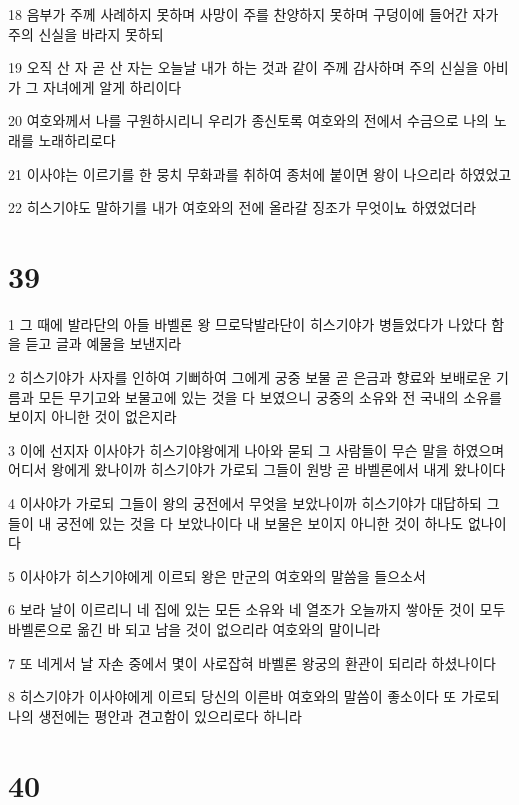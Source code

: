 \par 18 음부가 주께 사례하지 못하며 사망이 주를 찬양하지 못하며 구덩이에 들어간 자가 주의 신실을 바라지 못하되
\par 19 오직 산 자 곧 산 자는 오늘날 내가 하는 것과 같이 주께 감사하며 주의 신실을 아비가 그 자녀에게 알게 하리이다
\par 20 여호와께서 나를 구원하시리니 우리가 종신토록 여호와의 전에서 수금으로 나의 노래를 노래하리로다
\par 21 이사야는 이르기를 한 뭉치 무화과를 취하여 종처에 붙이면 왕이 나으리라 하였었고
\par 22 히스기야도 말하기를 내가 여호와의 전에 올라갈 징조가 무엇이뇨 하였었더라

\chapter{39}

\par 1 그 때에 발라단의 아들 바벨론 왕 므로닥발라단이 히스기야가 병들었다가 나았다 함을 듣고 글과 예물을 보낸지라
\par 2 히스기야가 사자를 인하여 기뻐하여 그에게 궁중 보물 곧 은금과 향료와 보배로운 기름과 모든 무기고와 보물고에 있는 것을 다 보였으니 궁중의 소유와 전 국내의 소유를 보이지 아니한 것이 없은지라
\par 3 이에 선지자 이사야가 히스기야왕에게 나아와 묻되 그 사람들이 무슨 말을 하였으며 어디서 왕에게 왔나이까 히스기야가 가로되 그들이 원방 곧 바벨론에서 내게 왔나이다
\par 4 이사야가 가로되 그들이 왕의 궁전에서 무엇을 보았나이까 히스기야가 대답하되 그들이 내 궁전에 있는 것을 다 보았나이다 내 보물은 보이지 아니한 것이 하나도 없나이다
\par 5 이사야가 히스기야에게 이르되 왕은 만군의 여호와의 말씀을 들으소서
\par 6 보라 날이 이르리니 네 집에 있는 모든 소유와 네 열조가 오늘까지 쌓아둔 것이 모두 바벨론으로 옮긴 바 되고 남을 것이 없으리라 여호와의 말이니라
\par 7 또 네게서 날 자손 중에서 몇이 사로잡혀 바벨론 왕궁의 환관이 되리라 하셨나이다
\par 8 히스기야가 이사야에게 이르되 당신의 이른바 여호와의 말씀이 좋소이다 또 가로되 나의 생전에는 평안과 견고함이 있으리로다 하니라

\chapter{40}

